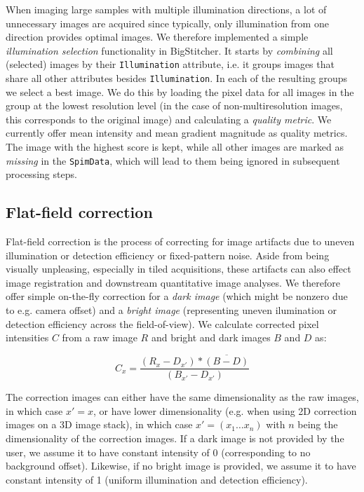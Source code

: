 When imaging large samples with multiple illumination directions,  a lot of unnecessary images are acquired since typically, only illumination from one direction provides optimal images. We therefore implemented a simple \emph{illumination selection} functionality in BigStitcher. It starts by \emph{combining} all (selected) images by their \texttt{Illumination} attribute, i.e. it groups images that share all other attributes besides \texttt{Illumination}. In each of the resulting groups we select a best image. We do this by loading the pixel data for all images in the group at the lowest resolution level (in the case of non-multiresolution images, this corresponds to the original image) and calculating a \emph{quality metric}. We currently offer mean intensity and mean gradient magnitude as quality metrics. The image with the highest score is kept, while all other images are marked as \emph{missing} in the \texttt{SpimData}, which will lead to them being ignored in subsequent processing steps. 

\subsection{Flat-field correction}

Flat-field correction is the process of correcting for image artifacts due to uneven illumination or detection efficiency or fixed-pattern noise. Aside from being visually unpleasing, especially in tiled acquisitions, these artifacts can also effect image registration and downstream quantitative image analyses. We therefore offer simple on-the-fly correction for a \emph{dark image} (which might be nonzero due to e.g. camera offset) and a \emph{bright image} (representing uneven ilumination or detection efficiency across the field-of-view). We calculate corrected pixel intensities $C$ from a raw image $R$ and bright and dark images $B$ and $D$ as:

\begin{equation}
\label{eq:flatfield-eq1}
C_{x} = \frac{(R_{x} - D_{x'}) * \overline{(B-D)} }{(B_{x'}- D_{x'})}
\end{equation}

The correction images can either have the same dimensionality as the raw images, in which case $x' = x$, or have lower dimensionality (e.g. when using 2D correction images on a 3D image stack), in which case $x' = (x_1 \hdots x_n)$ with $n$ being the dimensionality of the correction images. If a dark image is not provided by the user, we assume it to have constant intensity of 0 (corresponding to no background offset). Likewise, if no bright image is provided, we assume it to have constant intensity of 1 (uniform illumination and detection efficiency). 


